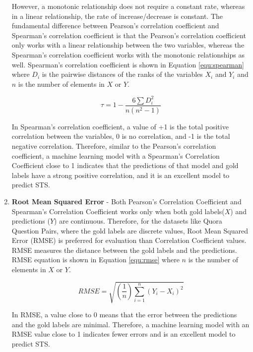 \begin{enumerate}
	However, a monotonic relationship does not require a constant rate, whereas in a linear relationship, the rate of increase/decrease is constant. The fundamental difference between Pearson's correlation coefficient and Spearman's correlation coefficient is that the Pearson's correlation coefficient only works with a linear relationship between the two variables, whereas the Spearman's correlation coefficient works with the monotonic relationships as well. Spearman's correlation coefficient is shown in Equation \ref{equ:spearman} where $D_i$ is the pairwise distances of the ranks of the variables $X_i$ and $Y_i$ and $n$ is the number of elements in $X$ or $Y$.   
	
	
	\begin{equation}
	\label{equ:spearman}
	\tau = 1- {\frac {6 \sum D_i^2}{n(n^2 - 1)}}
	\end{equation}
	
	In Spearman's correlation coefficient, a value of +1 is the total positive correlation between the variables, 0 is no correlation, and -1 is the total negative correlation. Therefore, similar to the Pearson's correlation coefficient, a machine learning model with a Spearman's Correlation Coefficient close to 1 indicates that the predictions of that model and gold labels have a strong positive correlation, and it is an excellent model to predict STS.
	
	\item \textbf{Root Mean Squared Error} - Both Pearson's Correlation Coefficient and Spearman's Correlation Coefficient works only when both gold labels($X$) and predictions ($Y$) are continuous. Therefore, for the datasets like Quora Question Pairs, where the gold labels are discrete values, Root Mean Squared Error (RMSE) is preferred for evaluation than Correlation Coefficient values. RMSE measures the distance between the gold labels and the predictions. RMSE equation is shown in Equation \ref{equ:rmse} where $n$ is the number of elements in $X$ or $Y$. 
	
	\begin{equation}
	\label{equ:rmse}
	RMSE = \sqrt{(\frac{1}{n})\sum_{i=1}^{n}(Y_{i} - X_{i})^{2}}
	\end{equation}

	In RMSE, a value close to 0 means that the error between the predictions and the gold labels are minimal. Therefore, a machine learning model with an RMSE value close to 1 indicates fewer errors and is an excellent model to predict STS.
	
\end{enumerate}

